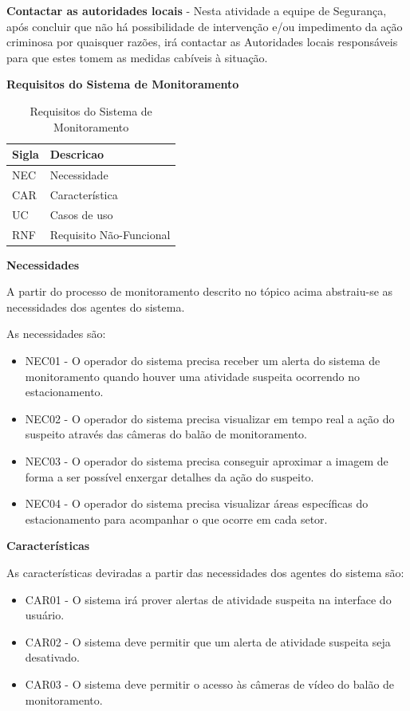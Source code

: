 \textbf{Contactar as autoridades locais} - Nesta atividade a equipe de Segurança, após concluir que não há possibilidade de intervenção e/ou impedimento da ação criminosa por quaisquer razões, irá contactar as Autoridades locais responsáveis para que estes tomem as medidas cabíveis à situação.
\\
\par
\textbf{Requisitos do Sistema de Monitoramento}
\begin{table}[H]
\centering
\begin{tabular}{|l|l|}
\hline
\textbf{Sigla}        & \textbf{Descricao} \\ \hline
NEC     & Necessidade                      \\ \hline
CAR   	& Característica				   \\ \hline
UC  	& Casos de uso                     \\ \hline
RNF 	& Requisito Não-Funcional          \\ \hline

\end{tabular}
\caption{Requisitos do Sistema de Monitoramento}
\label{Requisitos do Sistema de Monitoramento}
\end{table}

\textbf{Necessidades}
\par
A partir do processo de monitoramento descrito no tópico acima abstraiu-se as necessidades dos agentes do sistema.

As necessidades são:
\begin{itemize}
	\item NEC01 - O operador do sistema precisa receber um alerta do sistema de monitoramento quando houver uma atividade suspeita ocorrendo no estacionamento.
	\item NEC02 - O operador do sistema precisa visualizar em tempo real a ação do suspeito através das câmeras do balão de monitoramento.
	\item NEC03 - O operador do sistema precisa conseguir aproximar a imagem de forma a ser possível enxergar detalhes da ação do suspeito.
	\item NEC04 - O operador do sistema precisa visualizar áreas específicas do estacionamento para acompanhar o que ocorre em cada setor.
\end{itemize}

\textbf{Características}
\par
As características deviradas a partir das necessidades dos agentes do sistema são:
\begin{itemize}
	\item CAR01 - O sistema irá prover alertas de atividade suspeita na interface do usuário.
	\item CAR02 - O sistema deve permitir que um alerta de atividade suspeita seja desativado.
	\item CAR03 - O sistema deve permitir o acesso às câmeras de vídeo do balão de monitoramento.
\end{itemize}
